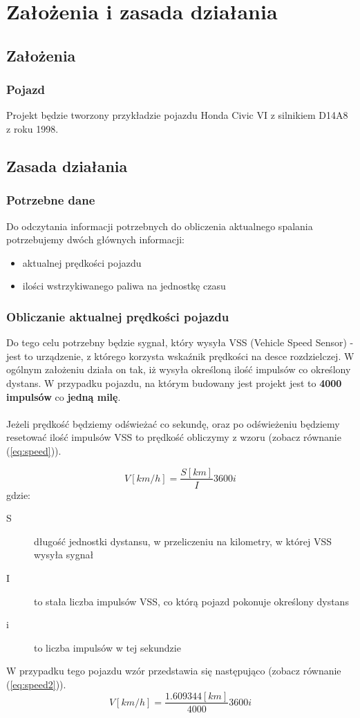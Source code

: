 \chapter{Założenia i zasada działania}
\section{Założenia}
\subsection{Pojazd}
Projekt będzie tworzony przykładzie pojazdu Honda Civic VI z silnikiem D14A8 z roku 1998.

\section{Zasada działania}
\subsection{Potrzebne dane}
Do odczytania informacji potrzebnych do obliczenia aktualnego spalania potrzebujemy dwóch głównych informacji:
\begin{itemize}
\item{aktualnej prędkości pojazdu}
\item{ilości wstrzykiwanego paliwa na jednostkę czasu}
\end{itemize}

\subsection{Obliczanie aktualnej prędkości pojazdu}
Do tego celu potrzebny będzie sygnał, który wysyła VSS (Vehicle Speed Sensor) - jest to urządzenie, z którego korzysta wskaźnik prędkości na desce rozdzielczej. W ogólnym założeniu działa on tak, iż wysyła określoną ilość impulsów co określony dystans. W przypadku pojazdu, na którym budowany jest projekt jest to \textbf{4000 impulsów} co \textbf{jedną milę}.\\
\\Jeżeli prędkość będziemy odświeżać co sekundę, oraz po odświeżeniu będziemy resetować ilość impulsów VSS to prędkość obliczymy z wzoru (zobacz równanie (\ref{eq:speed})).

\begin{equation}\label{eq:speed}
V[km/h] = \frac{S[km]}{I} 3600 i
\end{equation}
gdzie:
\begin{description}
\item[S] długość jednostki dystansu, w przeliczeniu na kilometry, w której VSS wysyła sygnał
\item[I] to stała liczba impulsów VSS, co którą pojazd pokonuje określony dystans
\item[i] to liczba impulsów w tej sekundzie
\end{description}
W przypadku tego pojazdu wzór przedstawia się następująco (zobacz równanie (\ref{eq:speed2})).
\begin{equation}\label{eq:speed2}
V[km/h] = \frac{1.609344[km]}{4000} 3600i
\end{equation}

